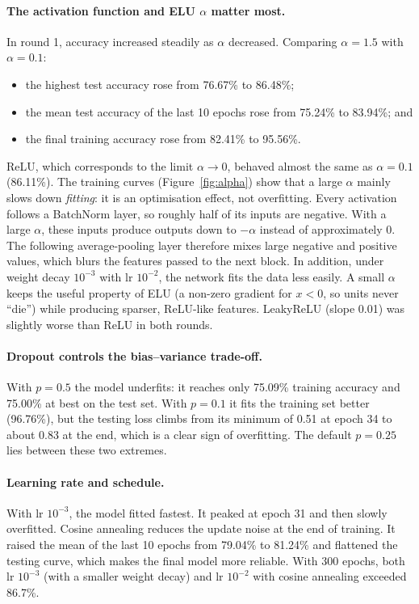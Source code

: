 \documentclass[11pt,a4paper]{article}
\begin{document}
\paragraph{The activation function and ELU $\alpha$ matter most.}
In round 1, accuracy increased steadily as $\alpha$ decreased. Comparing $\alpha=1.5$ with $\alpha=0.1$:
\begin{itemize}
  \item the highest test accuracy rose from 76.67\% to 86.48\%;
  \item the mean test accuracy of the last 10 epochs rose from 75.24\% to 83.94\%; and
  \item the final training accuracy rose from 82.41\% to 95.56\%.
\end{itemize}
ReLU, which corresponds to the limit $\alpha\to0$, behaved almost the same as $\alpha=0.1$ (86.11\%). The training curves (Figure~\ref{fig:alpha}) show that a large $\alpha$ mainly slows down \emph{fitting}: it is an optimisation effect, not overfitting. Every activation follows a BatchNorm layer, so roughly half of its inputs are negative. With a large $\alpha$, these inputs produce outputs down to $-\alpha$ instead of approximately 0. The following average-pooling layer therefore mixes large negative and positive values, which blurs the features passed to the next block. In addition, under weight decay $10^{-3}$ with lr $10^{-2}$, the network fits the data less easily. A small $\alpha$ keeps the useful property of ELU (a non-zero gradient for $x<0$, so units never ``die'') while producing sparser, ReLU-like features. LeakyReLU (slope 0.01) was slightly worse than ReLU in both rounds.

\paragraph{Dropout controls the bias--variance trade-off.}
With $p=0.5$ the model underfits: it reaches only 75.09\% training accuracy and 75.00\% at best on the test set. With $p=0.1$ it fits the training set better (96.76\%), but the testing loss climbs from its minimum of 0.51 at epoch 34 to about 0.83 at the end, which is a clear sign of overfitting. The default $p=0.25$ lies between these two extremes.

\paragraph{Learning rate and schedule.}
With lr $10^{-3}$, the model fitted fastest. It peaked at epoch 31 and then slowly overfitted. Cosine annealing reduces the update noise at the end of training. It raised the mean of the last 10 epochs from 79.04\% to 81.24\% and flattened the testing curve, which makes the final model more reliable. With 300 epochs, both lr $10^{-3}$ (with a smaller weight decay) and lr $10^{-2}$ with cosine annealing exceeded 86.7\%.
\end{document}
